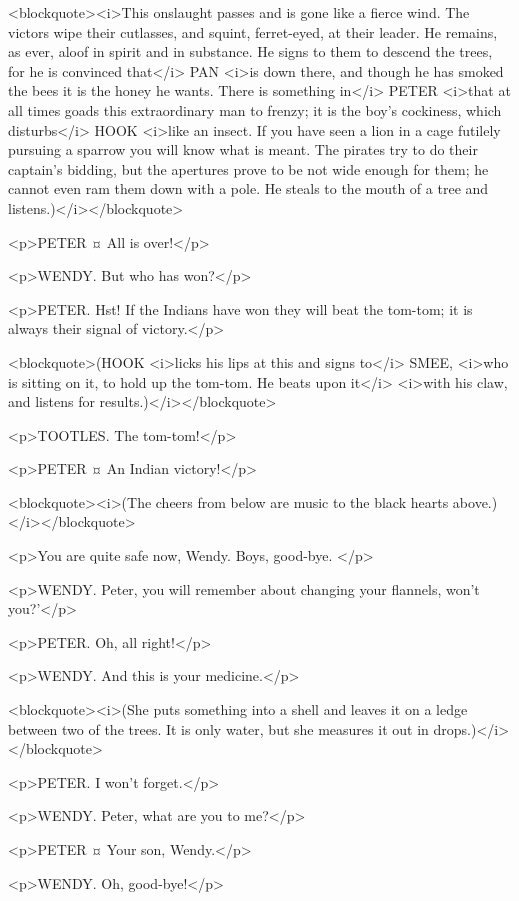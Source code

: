 <blockquote><i>This onslaught passes and is gone like a fierce wind. The victors wipe their cutlasses, and squint, ferret-eyed, at their leader. He remains, as ever, aloof in spirit and in substance. He signs to them to descend the trees, for he is convinced that</i> PAN <i>is down there, and though he has smoked the bees it is the honey he wants. There is something in</i> PETER <i>that at all times goads this extraordinary man to frenzy; it is the boy's cockiness, which disturbs</i> HOOK <i>like an insect. If you have seen a lion in a cage futilely pursuing a sparrow you will know what is meant. The pirates try to do their captain's bidding, but the apertures prove to be not wide enough for them; he cannot even ram them down with a pole. He steals to the mouth of a tree and listens.)</i></blockquote>

<p>PETER ¤
All is over!</p>

<p>WENDY. But who has won?</p>

<p>PETER. Hst! If the Indians have won they will beat the tom-tom; it is always their signal of victory.</p>

<blockquote>(HOOK <i>licks his lips at this and signs to</i> SMEE, <i>who is sitting on it, to hold up the tom-tom. He beats upon it</i> <i>with his claw, and listens for results.)</i></blockquote>

<p>TOOTLES. The tom-tom!</p>

<p>PETER ¤
An Indian victory!</p>

<blockquote><i>(The cheers from below are music to the black hearts above.)</i></blockquote>

<p>You are quite safe now, Wendy. Boys, good-bye.
</p>

<p>WENDY. Peter, you will remember about changing your flannels, won't you?'</p>

<p>PETER. Oh, all right!</p>

<p>WENDY. And this is your medicine.</p>

<blockquote><i>(She puts something into a shell and leaves it on a ledge between two of the trees. It is only water, but she measures it out in drops.)</i></blockquote>

<p>PETER. I won't forget.</p>

<p>WENDY. Peter, what are you to me?</p>

<p>PETER ¤
Your son, Wendy.</p>

<p>WENDY. Oh, good-bye!</p>

